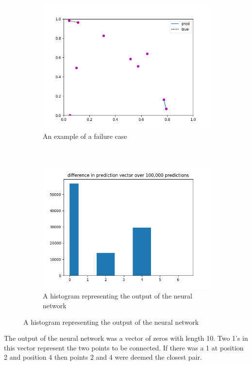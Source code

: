 \begin{figure}[h] %
\centering
\begin{subfigure}[t]{0.45\textwidth}
\centering
\includegraphics[width=\textwidth]{Figs/closest_dist_fail2.png}
\caption{An example of a failure case} 
\label{fig:3a} 
\end{subfigure}
~
\begin{subfigure}[t]{0.45\textwidth}
\includegraphics[width=\textwidth]{Figs/pred_dif_hist.png}
\caption{A histogram representing the output of the neural network} 
\label{fig:3b}
\end{subfigure}
\end{figure}

The output of the neural network was a vector of zeros with length 10. Two 1's in this vector represent the two points to be connected. If there was a 1 at position 2 and position 4 then points 2 and 4 were deemed the closest pair.

